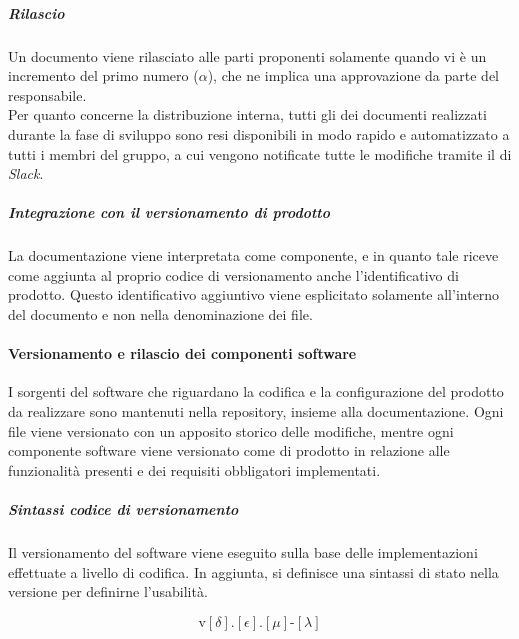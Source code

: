 		\subparagraph{Rilascio}

		Un documento viene rilasciato alle parti proponenti solamente quando vi è un incremento del primo numero (\(\alpha\)), che ne implica una approvazione da parte del responsabile. \\
		Per quanto concerne la distribuzione interna, tutti gli  dei documenti realizzati durante la fase di sviluppo sono resi disponibili in modo rapido e automatizzato a tutti i membri del gruppo, a cui vengono notificate tutte le modifiche tramite il  di \textit{Slack}.

		\subparagraph{Integrazione con il versionamento di prodotto}

		La documentazione viene interpretata come componente, e in quanto tale riceve come aggiunta al proprio codice di versionamento anche l'identificativo di prodotto. Questo identificativo aggiuntivo viene esplicitato solamente all'interno del documento e non nella denominazione dei file.

	\paragraph{Versionamento e rilascio dei componenti software}

	I sorgenti del software che riguardano la codifica e la configurazione del prodotto da realizzare sono mantenuti nella repository, insieme alla documentazione. Ogni file viene versionato con un apposito storico delle modifiche, mentre ogni componente software viene versionato come  di prodotto in relazione alle funzionalità presenti e dei requisiti obbligatori implementati.

		\subparagraph{Sintassi codice di versionamento}

		Il versionamento del software viene eseguito sulla base delle implementazioni effettuate a livello di codifica.
		In aggiunta, si definisce una sintassi di stato nella versione per definirne l'usabilità.

		\[%
			\text{v}[\delta].[\epsilon].[\mu]\text{-}[\lambda]
		\]

